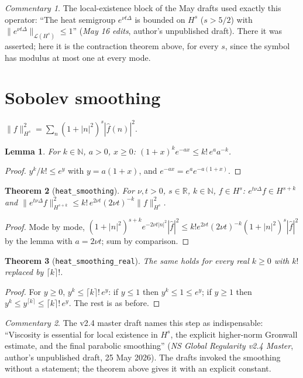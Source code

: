 \documentclass[11pt]{article}
\newtheorem{theorem}{Theorem}\newtheorem{lemma}[theorem]{Lemma}
\theoremstyle{remark}\newtheorem*{commentary}{Commentary}
\begin{document}
\begin{commentary} The local-existence block of the May drafts used exactly this operator:
``The heat semigroup $e^{\nu t\Delta}$ is bounded on $H^s$ ($s>5/2$) with
$\|e^{\nu t\Delta}\|_{\mathcal L(H^s)}\le1$'' (\emph{May 16 edits}, author's unpublished draft). There it was asserted;
here it is the contraction theorem above, for every $s$, since the symbol has modulus at most one
at every mode.\end{commentary}

\section{Sobolev smoothing}
$\|f\|_{H^s}^2=\sum_n(1+|n|^2)^s|\hat f(n)|^2$.
\begin{lemma} For $k\in\mathbb N$, $a>0$, $x\ge0$: $(1+x)^ke^{-ax}\le k!\,e^a a^{-k}$.\end{lemma}
\begin{proof} $y^k/k!\le e^y$ with $y=a(1+x)$, and $e^{-ax}=e^ae^{-a(1+x)}$.\end{proof}
\begin{theorem}[\texttt{heat\_smoothing}] For $\nu,t>0$, $s\in\mathbb R$, $k\in\mathbb N$, $f\in H^s$:
$e^{t\nu\Delta}f\in H^{s+k}$ and $\|e^{t\nu\Delta}f\|_{H^{s+k}}^2\le k!\,e^{2\nu t}(2\nu t)^{-k}\|f\|_{H^s}^2$.\end{theorem}
\begin{proof} Mode by mode,
$(1+|n|^2)^{s+k}e^{-2\nu t|n|^2}|\hat f|^2\le k!e^{2\nu t}(2\nu t)^{-k}(1+|n|^2)^s|\hat f|^2$ by the lemma with
$a=2\nu t$; sum by comparison.\end{proof}
\begin{theorem}[\texttt{heat\_smoothing\_real}] The same holds for every real $k\ge0$ with $k!$
replaced by $\lceil k\rceil!$.\end{theorem}
\begin{proof} For $y\ge0$, $y^k\le\lceil k\rceil!\,e^y$: if $y\le1$ then $y^k\le1\le e^y$; if $y\ge1$
then $y^k\le y^{\lceil k\rceil}\le\lceil k\rceil!\,e^y$. The rest is as before.\end{proof}
\begin{commentary} The v2.4 master draft names this step as indispensable: ``Viscosity is essential
for local existence in $H^s$, the explicit higher-norm Gronwall estimate, and the final parabolic
smoothing'' (\emph{NS Global Regularity v2.4 Master}, author's unpublished draft, 25 May 2026). The drafts invoked the
smoothing without a statement; the theorem above gives it with an explicit constant.\end{commentary}
\end{document}
